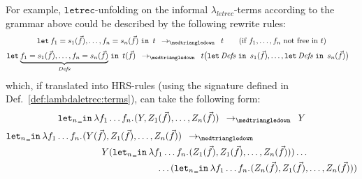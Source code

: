 \documentclass[submission,copyright,creativecommons]{eptcs}
\newcommand{\lambdaletrec}{\ensuremath{\lambda_\textit{letrec}}}
\newcommand{\letrec}{\texttt{letrec}}
\newcommand{\bmetavar}{Y}
\newcommand{\cmetavar}{Z}
\newcommand{\slabs}{{\lambda}}
\newcommand{\lbind}[1]{{\slabs{#1}}}
\newcommand{\labs}[2]{\lbind{#1}.\hspace*{0.5pt}{#2}}
\newcommand{\afunvar}{f}
\newcommand{\allter}{t}
\newcommand{\bllter}{s}
\newcommand{\slet}{\texttt{let}}
\newcommand{\sletini}[1]{\slet_{#1}\texttt{\_in}}
\newcommand{\letini}[2]{\sletini{#1}{\hspace*{2pt}}{#2}}
\newcommand{\letbeIn}[2]{\slet{\hspace*{2pt}}{#1}{\hspace*{3pt}\texttt{in}\hspace*{5pt}}{#2}}
\newcommand{\indap}[2]{#1_{#2}}
\newcommand{\sredi}{\indap{\rightarrow}}
\newcommand{\unfoldredsubscript}{\medtriangledown}
\newcommand{\sunfoldred}{\sredi{\unfoldredsubscript}}
\newcommand{\funap}[2]{{#1}({#2})}
\newcommand{\nbd}{\nobreakdash}
\renewcommand\;{\,}
\begin{document}
For example, $\letrec$\nbd-unfolding on the informal $\lambdaletrec$\nbd-terms according to the grammar above
could be described by the following rewrite rules:
\begin{gather*}
\letbeIn{\afunvar_1 = \funap{\bllter_1}{\vec{\afunvar}}, \ldots, \afunvar_n = \funap{\bllter_n}{\vec{\afunvar}}}
          {\allter} 
    \;\;\;\sunfoldred\;\;\;
  \allter 
  \qquad \text{(if $\afunvar_1,\ldots,\afunvar_n$ not free in $\allter$)}
  \\[0.5ex]
  \begin{aligned} 
    &
    \letbeIn{\underbrace{\afunvar_1 = \funap{\bllter_1}{\vec{\afunvar}}, \ldots, \afunvar_n = \funap{\bllter_n}{\vec{\afunvar}}}_{\mathit{Defs}}}
            {\funap{\allter}{\vec{\afunvar}}}  
    \;\;\;\sunfoldred\;\;\;
\allter\bigl(\letbeIn{\mathit{Defs}}
                    {\funap{\bllter_1}{\vec{\afunvar}}}, \ldots,  \letbeIn{\mathit{Defs}}
                   {\funap{\bllter_n}{\vec{\afunvar}}}\bigl)
\end{aligned}
\end{gather*}     
which, if translated into HRS\nbd-rules (using the signature defined in Def.~\ref{def:lambdaletrec:terms}),
can take the following form:  
\begin{gather*}
\letini{n}{\labs{\afunvar_1\ldots\afunvar_n}{(\bmetavar,\funap{\cmetavar_1}{\vec{\afunvar}},\ldots,\funap{\cmetavar_n}{\vec{\afunvar}})}}
    \;\;\;\sunfoldred\;\;\;
  \bmetavar
  \\[0.5ex]
  \begin{aligned}
    &
    \letini{n}{\labs{\afunvar_1\ldots\afunvar_n}
                    {(\funap{\bmetavar}{\vec{\afunvar}},\funap{\cmetavar_1}{\vec{\afunvar}} ,\ldots, \funap{\cmetavar_n}{\vec{\afunvar}})}
               } 
    \;\;\;\sunfoldred\;\;\;
    \\
    & \hspace*{24ex}
\bmetavar
    (\letini{n}{\labs{\afunvar_1\ldots\afunvar_n}
               {({\funap{\cmetavar_1}{\vec{\afunvar}}},
                 \funap{\cmetavar_1}{\vec{\afunvar}},\ldots,\funap{\cmetavar_n}{\vec{\afunvar}})}}) \ldots
    \\
    & \hspace*{36ex}
    \phantom{\bmetavar}
    \ldots   
    (\letini{n}{\labs{\afunvar_1\ldots\afunvar_n}
               {({\funap{\cmetavar_n}{\vec{\afunvar}}},\funap{\cmetavar_1}{\vec{\afunvar}},\ldots,\funap{\cmetavar_n}{\vec{\afunvar}})}})          
  \end{aligned}            
\end{gather*}      
      
\end{document}
